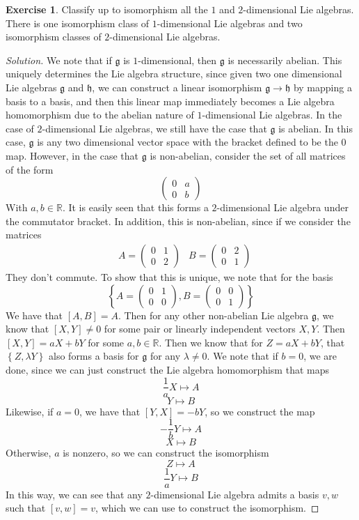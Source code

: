 \documentclass[psamsfonts]{amsart}
\theoremstyle{definition}
\newtheorem{exer}[thm]{Exercise}
\theoremstyle{remark}
\newcommand{\R}{\mathbb{R}}
\newcommand{\g}{\mathfrak{g}}
\newcommand{\bra}[2]{ \left[ #1, #2 \right] }
\newcommand{\set}[1]{\left\lbrace#1 \right\rbrace}
\begin{document}
\begin{exer}
Classify up to isomorphism all the $1$ and $2$-dimensional Lie algebras. There is one isomorphism class of $1$-dimensional Lie algebras and two isomorphism classes of $2$-dimensional Lie algebras.
\end{exer}

\begin{proof}[Solution]
We note that if $\g$ is $1$-dimensional, then $\g$ is necessarily abelian. This uniquely determines the Lie algebra structure, since given two one dimensional Lie algebras $\g$ and $\mathfrak{h}$, we can construct a linear isomorphism $\g \to \mathfrak{h}$ by mapping a basis to a basis, and then this linear map immediately becomes a Lie algebra homomorphism due to the abelian nature of $1$-dimensional Lie algebras. In the case of $2$-dimensional Lie algebras, we still have the case that $\g$ is abelian. In this case, $\g$ is any two dimensional vector space with the bracket defined to be the $0$ map. However, in the case that $\g$ is non-abelian, consider the set of all matrices of the form
$$\begin{pmatrix}
0 & a \\
0 & b
\end{pmatrix} $$
With $a,b \in \R$. It is easily seen that this forms a $2$-dimensional Lie algebra under the commutator bracket. In addition, this is non-abelian, since if we consider the matrices
\begin{align*}
&A = \begin{pmatrix}
0 & 1 \\
0 & 2
\end{pmatrix} & B = \begin{pmatrix}
0 & 2 \\
0 & 1
\end{pmatrix}
\end{align*}
They don't commute. To show that this is unique, we note that for the basis 
$$\set{A= \begin{pmatrix}
0 & 1 \\
0 & 0
\end{pmatrix}, B= \begin{pmatrix}
0 & 0 \\
0 & 1
\end{pmatrix}} $$
We have that $\bra{A}{B} = A$. Then for any other non-abelian Lie algebra $\g$, we know that $\bra{X}{Y} \neq 0$ for some pair or linearly independent vectors $X,Y$. Then $\bra{X}{Y} = aX + bY$ for some $a,b \in \R$. Then we know that for $Z = aX + bY$, that $\set{Z,\lambda Y}$ also forms a basis for $\g$ for any $\lambda \neq 0$.  We note that if $b = 0$, we are done, since we can just construct the Lie algebra homomorphism that maps 
$$\frac{1}{a}X \mapsto A$$ 
 $$Y \mapsto B$$
 Likewise, if $a = 0$, we have that $\bra{Y}{X} = -bY$, so we construct the map 
 $$-\frac{1}{b}Y \mapsto A$$
 $$X \mapsto B$$
  Otherwise, $a$ is nonzero, so we can construct the isomorphism 
  $$Z \mapsto A$$ 
  $$\frac{1}{a}Y \mapsto B$$
In this way, we can see that any $2$-dimensional Lie algebra admits a basis $v,w$ such that $\bra{v}{w} = v$, which we can use to construct the isomorphism.
\end{proof}
\end{document}
